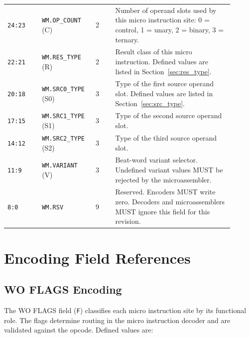 \begin{longtable}{@{}L{0.14\linewidth}L{0.20\linewidth}R{0.08\linewidth}L{0.48\linewidth}@{}}
\texttt{24:23} & \texttt{WM.OP\_COUNT} (C) & 2 & Number of operand slots used by this micro instruction site: 0 = control, 1 = unary, 2 = binary, 3 = ternary. \\
\texttt{22:21} & \texttt{WM.RES\_TYPE} (R) & 2 & Result class of this micro instruction. Defined values are listed in Section~\ref{sec:res_type}. \\
\texttt{20:18} & \texttt{WM.SRC0\_TYPE} (S0) & 3 & Type of the first source operand slot. Defined values are listed in Section~\ref{sec:src_type}. \\
\texttt{17:15} & \texttt{WM.SRC1\_TYPE} (S1) & 3 & Type of the second source operand slot. \\
\texttt{14:12} & \texttt{WM.SRC2\_TYPE} (S2) & 3 & Type of the third source operand slot. \\
\texttt{11:9} & \texttt{WM.VARIANT} (V) & 3 & Beat-word variant selector. Undefined variant values MUST be rejected by the microassembler. \\
\texttt{8:0} & \texttt{WM.RSV} & 9 & Reserved. Encoders MUST write zero. Decoders and microassemblers MUST ignore this field for this revision. \\
\bottomrule
\end{longtable}

\section{Encoding Field References}
\subsection{WO FLAGS Encoding}
\label{sec:wo_flags}
The WO FLAGS field (\texttt{F}) classifies each micro instruction site by its functional role. The flags determine routing in the micro instruction decoder and are validated against the opcode. Defined values are:

